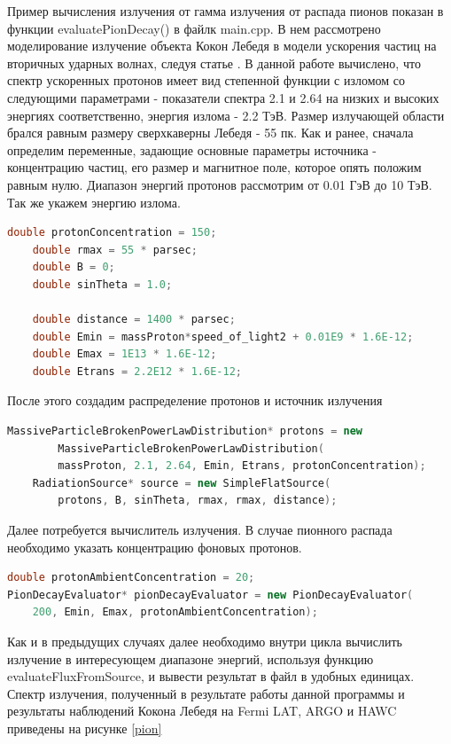 Пример вычисления излучения от гамма излучения от распада пионов показан в функции evaluatePionDecay() в файлк main.cpp. В нем рассмотрено моделирование излучение объекта Кокон Лебедя в модели ускорения частиц на вторичных ударных волнах, следуя статье \cite{BykovKalyashova2022}. В данной работе вычислено, что спектр ускоренных протонов имеет вид степенной функции с изломом со следующими параметрами - показатели спектра 2.1 и 2.64 на низких и высоких энергиях соответственно, энергия излома - 2.2 ТэВ. Размер излучающей области брался равным размеру сверхкаверны Лебедя - 55 пк. Как и ранее, сначала определим переменные, задающие основные параметры источника - концентрацию частиц, его размер и магнитное поле, которое опять положим равным нулю. Диапазон энергий протонов рассмотрим от 0.01 ГэВ до 10 ТэВ. Так же укажем энергию излома.
\begin{lstlisting}[language=c++]
	double protonConcentration = 150;
	double rmax = 55 * parsec;
	double B = 0;
	double sinTheta = 1.0;

	double distance = 1400 * parsec;
	double Emin = massProton*speed_of_light2 + 0.01E9 * 1.6E-12;
	double Emax = 1E13 * 1.6E-12;
	double Etrans = 2.2E12 * 1.6E-12;
\end{lstlisting}
После этого создадим распределение протонов и источник излучения
\begin{lstlisting}[language=c++]
	MassiveParticleBrokenPowerLawDistribution* protons = new 
		MassiveParticleBrokenPowerLawDistribution(
		massProton, 2.1, 2.64, Emin, Etrans, protonConcentration);
	RadiationSource* source = new SimpleFlatSource(
		protons, B, sinTheta, rmax, rmax, distance);
\end{lstlisting}
Далее потребуется вычислитель излучения. В случае пионного распада необходимо указать концентрацию фоновых протонов.
\begin{lstlisting}[language=c++]
double protonAmbientConcentration = 20;
PionDecayEvaluator* pionDecayEvaluator = new PionDecayEvaluator(
	200, Emin, Emax, protonAmbientConcentration);
\end{lstlisting}
Как и в предыдущих случаях далее необходимо внутри цикла вычислить излучение в интересующем диапазоне энергий, используя функцию evaluateFluxFromSource, и вывести результат в файл в удобных единицах. Спектр излучения, полученный в результате работы данной программы и результаты наблюдений Кокона Лебедя на Fermi LAT, ARGO и HAWC \cite{Ackermann2011, Bartoli2014, Abeysekara2021} приведены на рисунке \ref{pion}

